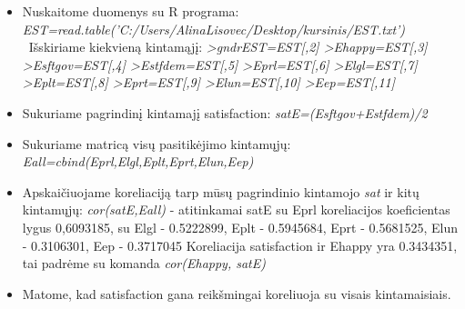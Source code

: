\documentclass[12pt,a4paper]{article}
\theoremstyle{change}\newtheorem{salyga}{Uždavinys}
\begin{document}
\begin{itemize}
\item Nuskaitome duomenys su R programa: 
\newline
\textit {EST=read.table('C:/Users/AlinaLisovec/Desktop/kursinis/EST.txt')}
\ Išskiriame kiekvieną kintamąjį:
\newline
\textit {>gndrEST=EST[,2] 
\newline >Ehappy=EST[,3] 
\newline >Esftgov=EST[,4]
\newline >Estfdem=EST[,5]
\newline >Eprl=EST[,6]
\newline >Elgl=EST[,7]
\newline >Eplt=EST[,8]
\newline >Eprt=EST[,9]
\newline >Elun=EST[,10]
\newline >Eep=EST[,11]}

\item Sukuriame pagrindinį kintamajį satisfaction:
\newline 
\textit{satE=(Esftgov+Estfdem)/2}
\item Sukuriame matricą visų pasitikėjimo kintamųjų:
\newline \textit {Eall=cbind(Eprl,Elgl,Eplt,Eprt,Elun,Eep)}
\item Apskaičiuojame koreliaciją tarp mūsų pagrindinio kintamojo \textit{sat} ir kitų kintamųjų:
\newline  \textit{cor(satE,Eall)}  -  atitinkamai satE su Eprl koreliacijos koeficientas lygus 0,6093185,  su  Elgl -  0.5222899,  Eplt - 0.5945684, Eprt - 0.5681525, Elun - 0.3106301, Eep - 0.3717045
\newline Koreliacija satisfaction ir  Ehappy yra 0.3434351, tai padrėme su komanda 
\newline \textit{cor(Ehappy, satE)}
\item Matome, kad satisfaction gana reikšmingai koreliuoja su visais kintamaisiais.


\end{itemize}
\end{document}
